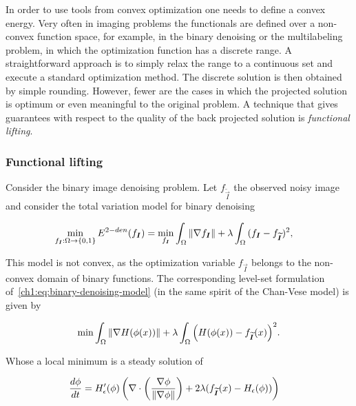 In order to use tools from convex optimization one needs to define a convex energy. Very often in imaging problems the functionals are defined over a non-convex function space, for example, in the binary denoising or the multilabeling problem, in which the optimization function has a discrete range. A straightforward approach is to simply relax the range to a continuous set and execute a standard optimization method. The discrete solution is then obtained by simple rounding. However, fewer are the cases in which the projected solution is optimum or even meaningful to the original problem. A technique that gives guarantees with respect to the quality of the back projected solution is \emph{functional lifting}.

\subsubsection{Functional lifting}

Consider the binary image denoising problem. Let $f_{\widetilde{\vec{I}}}$ the observed noisy image and consider the total variation model for binary denoising

\begin{align}
	\min_{f_{\bm{I}}:\Omega \rightarrow \{0,1\} } E^{2-den}(f_{\bm{I}}) &= \min_{f_{\bm{I}}} \int_{\Omega}{\lVert\nabla f_{\bm{I}}\rVert} + \lambda \int_{\Omega}{ (f_{\bm{I}}-f_{\widetilde{\bm{I}}})^2}
	\label{ch1:eq:binary-denoising-model},
\end{align}

This model is not convex, as the optimization  variable $f_{\vec{I}}$ belongs to the non-convex domain of binary functions. The corresponding level-set formulation of~\cref{ch1:eq:binary-denoising-model} (in the same spirit of the Chan-Vese model) is given by

\begin{align}
	\min_{}{ \int_{\Omega}{ \lVert\nabla H(\phi(x))\rVert } + \lambda \int_{\Omega}{\left( H(\phi(x)) - f_{\widetilde{\bm{I}}}(x) \right)^2}}.
	\label{ch1:eq:2-den-level-set-energy}
\end{align}

Whose a local minimum is a steady solution of

\begin{align}
	\frac{d\phi}{dt} &= H_{\epsilon}^{\prime}(\phi)\left(  \nabla \cdot \left( \frac{ \nabla \phi}{\lVert\nabla \phi\rVert}\right) + 2\lambda(f_{\widetilde{\bm{I}}}(x) - H_{\epsilon}(\phi)) \right)
	\label{ch1:eq:level-set-ball-flow}
\end{align}

